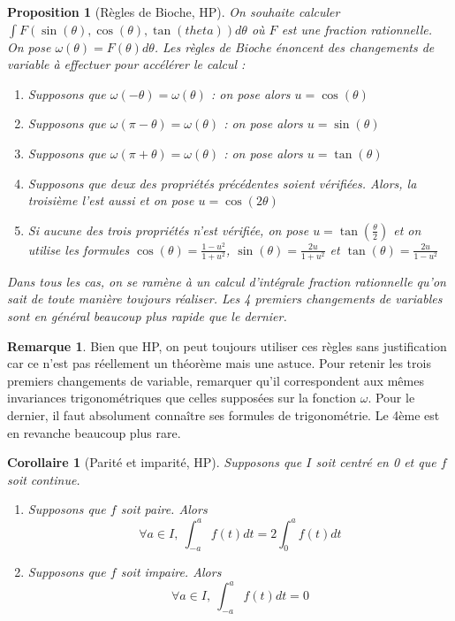 \documentclass[french]{book}
\theoremstyle{plain}
\newtheorem{prop}{Proposition}[chapter]
\newtheorem{cor}{Corollaire}[chapter]
\theoremstyle{definition}
\newtheorem{rmq}{Remarque}[chapter]
\theoremstyle{remark}
\begin{document}
\begin{prop}[Règles de Bioche, HP]
	On souhaite calculer $\int F(\sin(\theta),\cos(\theta),\tan(theta))d\theta$ où $F$ est une fraction rationnelle. On pose $\omega(\theta)=F(\theta)d\theta$. Les règles de Bioche énoncent des changements de variable à effectuer pour accélérer le calcul :
	\begin{enumerate}
		\item Supposons que $\omega(-\theta)=\omega(\theta)$ : on pose alors $u=\cos(\theta)$
		\item Supposons que $\omega(\pi-\theta)=\omega(\theta)$ : on pose alors $u=\sin(\theta)$
		\item Supposons que $\omega(\pi+\theta)=\omega(\theta)$ : on pose alors $u=\tan(\theta)$
		\item Supposons que deux des propriétés précédentes soient vérifiées. Alors, la troisième l'est aussi et on pose $u=\cos(2\theta)$
		\item Si aucune des trois propriétés n'est vérifiée, on pose $\displaystyle u=\tan\left(\frac{\theta}{2}\right)$ et on utilise les formules $\displaystyle \cos(\theta)=\frac{1-u^2}{1+u^2}$, $\displaystyle \sin(\theta)=\frac{2u}{1+u^2}$ et $\displaystyle \tan(\theta)=\frac{2u}{1-u^2}$
	\end{enumerate}
	Dans tous les cas, on se ramène à un calcul d'intégrale fraction rationnelle qu'on sait de toute manière toujours réaliser. Les 4 premiers changements de variables sont en général beaucoup plus rapide que le dernier.
\end{prop}
\begin{rmq} Bien que HP, on peut toujours utiliser ces règles sans justification car ce n'est pas réellement un théorème mais une astuce. Pour retenir les trois premiers changements de variable, remarquer qu'il correspondent aux mêmes invariances trigonométriques que celles supposées sur la fonction $\omega$. Pour le dernier, il faut absolument connaître ses formules de trigonométrie. Le 4ème est en revanche beaucoup plus rare. \end{rmq}
\begin{cor}[Parité et imparité, HP]
	Supposons que $I$ soit centré en 0 et que $f$ soit continue.
	\begin{enumerate}
		\item Supposons que $f$ soit paire. Alors $$\forall a \in I, \ \int_{-a}^{a}f(t)dt=2\int_{0}^{a}f(t)dt$$
		\item Supposons que $f$ soit impaire. Alors $$\forall a \in I, \ \int_{-a}^{a}f(t)dt=0$$
	\end{enumerate}
\end{cor}
\end{document}
